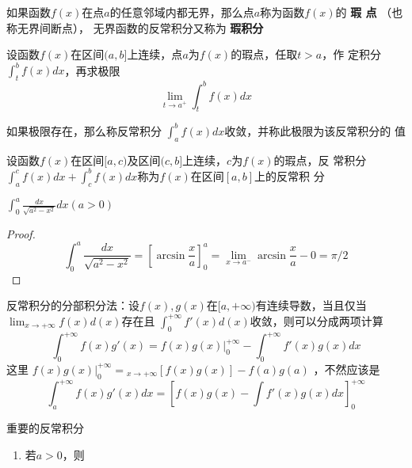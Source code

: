 \documentclass[11pt]{article}
\begin{document}
如果函数\(f(x)\)在点\(a\)的任意邻域内都无界，那么点\(a\)称为函数\(f(x)\)的 \textbf{瑕
点}  （也称无界间断点）， 无界函数的反常积分又称为 \textbf{瑕积分}

设函数\(f(x)\)在区间\((a,b]\)上连续，点\(a\)为\(f(x)\)的瑕点，任取\(t>a\)，作
定积分\(\int_t^bf(x)dx\)，再求极限
\begin{equation*}
\lim_{t\to a^+}\int^b_tf(x)dx
\end{equation*}

\begin{definition}[]
如果极限存在，那么称反常积分 \(\int_a^bf(x)dx\)收敛，并称此极限为该反常积分的
值
\end{definition}

设函数\(f(x)\)在区间\([a,c)\)及区间\((c,b]\)上连续，\(c\)为\(f(x)\)的瑕点，反
常积分\(\int_a^cf(x)dx+\int_c^bf(x)dx\)称为\(f(x)\)在区间\([a,b]\)上的反常积
分

\begin{proposition}[]
\(\int_0^a\frac{dx}{\sqrt{a^2-x^2}}dx(a>0)\)
\end{proposition}

\begin{proof}
\begin{equation*}
\int_0^a\frac{dx}{\sqrt{a^2-x^2}}=[\arcsin\frac{x}{a}]^a_0=\lim_{x\to a^-}
\arcsin \frac{x}{a}-0=\pi/2
\end{equation*}
\end{proof}

反常积分的分部积分法：设\(f(x),g(x)\)在\([a,+\infty)\)有连续导数，当且仅当
\(\displaystyle\lim_{x\to+\infty}f(x)d(x)\)存在且
\(\int_0^{+\infty}f'(x)d(x)\)收敛，则可以分成两项计算
\begin{equation*}
\int_0^{+\infty}f(x)g'(x)=f(x)g(x)\Big\rvert_0^{ +\infty}-
\int^{ +\infty}_0f'(x)g(x)dx
\end{equation*}
这里
\(f(x)g(x)\Big\rvert_0^{+\infty}=\displaystyle_{x\to+\infty}[f(x)g(x)]-f(a)g(a)\)
，不然应该是
\begin{equation*}
\int_a^{+\infty}f(x)g'(x)dx=\left[f(x)g(x)-\int f'(x)g(x)dx\right]_0^{+\infty}
\end{equation*}

重要的反常积分
\begin{enumerate}
\item 若\(a>0\)，则
\end{enumerate}
\end{document}
